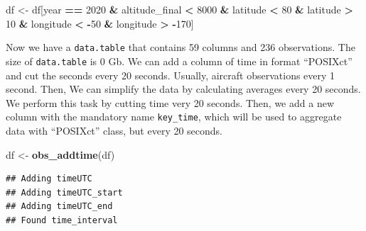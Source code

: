\documentclass[10pt,a4paper,onecolumn]{article}
\newenvironment{Shaded}{\begin{snugshade}}{\end{snugshade}}
\newcommand{\DecValTok}[1]{\textcolor[rgb]{0.00,0.00,0.81}{#1}}
\newcommand{\FunctionTok}[1]{\textcolor[rgb]{0.13,0.29,0.53}{\textbf{#1}}}
\newcommand{\NormalTok}[1]{#1}
\newcommand{\OtherTok}[1]{\textcolor[rgb]{0.56,0.35,0.01}{#1}}
\newcommand{\SpecialCharTok}[1]{\textcolor[rgb]{0.81,0.36,0.00}{\textbf{#1}}}
\begin{document}
\begin{Shaded}
\begin{Highlighting}[]
\NormalTok{df }\OtherTok{\textless{}{-}}\NormalTok{ df[year }\SpecialCharTok{==} \DecValTok{2020} \SpecialCharTok{\&}
\NormalTok{           altitude\_final }\SpecialCharTok{\textless{}} \DecValTok{8000} \SpecialCharTok{\&}
\NormalTok{           latitude }\SpecialCharTok{\textless{}} \DecValTok{80} \SpecialCharTok{\&}
\NormalTok{           latitude }\SpecialCharTok{\textgreater{}} \DecValTok{10} \SpecialCharTok{\&}
\NormalTok{           longitude }\SpecialCharTok{\textless{}} \SpecialCharTok{{-}}\DecValTok{50} \SpecialCharTok{\&}
\NormalTok{           longitude }\SpecialCharTok{\textgreater{}} \SpecialCharTok{{-}}\DecValTok{170}\NormalTok{]}
\end{Highlighting}
\end{Shaded}

Now we have a \texttt{data.table} that contains 59 columns and 236
observations. The size of \texttt{data.table} is 0 Gb. We can add a
column of time in format ``POSIXct'' and cut the seconds every 20
seconds. Usually, aircraft observations every 1 second. Then, We can
simplify the data by calculating averages every 20 seconds. We perform
this task by cutting time very 20 seconds. Then, we add a new column
with the mandatory name \texttt{key\_time}, which will be used to
aggregate data with ``POSIXct'' class, but every 20 seconds.

\begin{Shaded}
\begin{Highlighting}[]
\NormalTok{df }\OtherTok{\textless{}{-}} \FunctionTok{obs\_addtime}\NormalTok{(df)}
\end{Highlighting}
\end{Shaded}

\begin{verbatim}
## Adding timeUTC
## Adding timeUTC_start
## Adding timeUTC_end
## Found time_interval
\end{verbatim}
\end{document}
